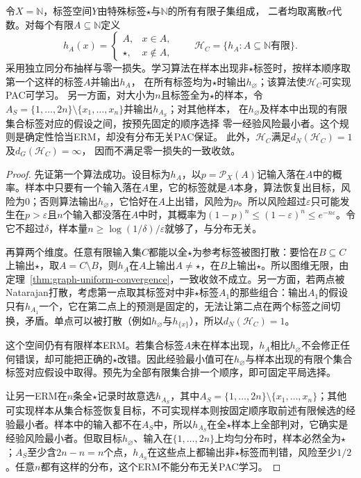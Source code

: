 \begin{theorem}[可学习性不推出一致收敛]
\label{thm:multiclass-erm-separation}
令$X=\mathbb N$，标签空间$Y$由特殊标签$\star$与$\mathbb N$的所有有限子集组成，
二者均取离散$\sigma$代数。对每个有限$A\subseteq\mathbb N$定义
\[
 h_A(x)=\begin{cases}A,&x\in A,\\\star,&x\notin A,\end{cases}
 \qquad
 \mathcal H_C=\{h_A:A\subseteq\mathbb N\text{有限}\}.
\]
采用独立同分布抽样与零一损失。学习算法在样本出现非$\star$标签时，按样本顺序取第一个这样的标签$A$并输出$h_A$，
在所有标签均为$\star$时输出$h_{\varnothing}$；该算法使$\mathcal H_C$可实现PAC可学习。
另一方面，对大小为$n$且标签全为$\star$的样本，令
$A_S=\{1,\ldots,2n\}\setminus\{x_1,\ldots,x_n\}$并输出$h_{A_S}$；对其他样本，
在$h_{\varnothing}$及样本中出现的有限集合标签对应的假设之间，按预先固定的顺序选择
零一经验风险最小者。这个规则是确定性恰当ERM，却没有分布无关PAC保证。
此外，$\mathcal H_C$满足$d_N(\mathcal H_C)=1$及$d_G(\mathcal H_C)=\infty$，
因而不满足零一损失的一致收敛。
\end{theorem}

\begin{proof}
先证第一个算法成功。设目标为$h_A$，以$p=\mathcal P_X(A)$记输入落在$A$中的概率。样本中只要有一个输入落在$A$里，它的标签就是$A$本身，算法恢复出目标，风险为0；否则算法输出$h_{\varnothing}$，它恰好在$A$上出错，风险为$p$。所以风险超过$\varepsilon$只可能发生在$p>\varepsilon$且$n$个输入都没落在$A$中时，其概率为$(1-p)^n\leq(1-\varepsilon)^n\leq e^{-n\varepsilon}$。令它不超过$\delta$，样本量$n\geq\log(1/\delta)/\varepsilon$就够了，与分布无关。

再算两个维度。任意有限输入集$C$都能以全$\star$为参考标签被图打散：要恰在$B\subseteq C$上输出$\star$，取$A=C\setminus B$，则$h_A$在$A$上输出$A\neq\star$，在$B$上输出$\star$。所以图维无限，由定理~\ref{thm:graph-uniform-convergence}，一致收敛不成立。另一方面，若两点被Natarajan打散，考虑第一点取其标签对中非$\star$标签$A_1$的那些组合：输出$A_1$的假设只有$h_{A_1}$一个，它在第二点上的预测是固定的，无法让第二点在两个标签之间切换，矛盾。单点可以被打散（例如$h_{\varnothing}$与$h_{\{x\}}$），所以$d_N(\mathcal H_C)=1$。

这个空间仍有有限样本ERM。若集合标签$A$未在样本出现，$h_A$相比$h_{\varnothing}$不会修正任何错误，却可能把正确的$\star$改错。因此经验最小值可在$h_{\varnothing}$与样本出现的有限个集合标签对应假设中取得。预先为全部有限集合排一个顺序，即可固定平局选择。

让另一ERM在$n$条全$\star$记录时故意选$h_{A_S}$，其中$A_S=\{1,\ldots,2n\}\setminus\{x_1,\ldots,x_n\}$；其他可实现样本从集合标签恢复目标，不可实现样本则按固定顺序取前述有限候选的经验最小者。样本中的输入都不在$A_S$中，所以$h_{A_S}$在全$\star$样本上全部判对，它确实是经验风险最小者。但取目标$h_{\varnothing}$、输入在$\{1,\ldots,2n\}$上均匀分布时，样本必然全为$\star$；$A_S$至少含$2n-n=n$个点，$h_{A_S}$在这些点上都输出非$\star$标签而判错，风险至少$1/2$。任意$n$都有这样的分布，这个ERM不能分布无关PAC学习。
\end{proof}

